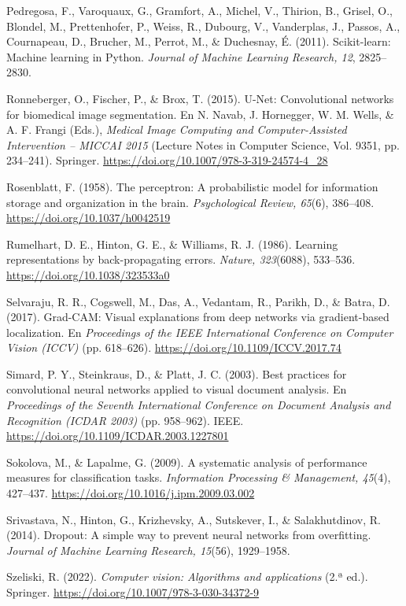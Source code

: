 \documentclass[11pt,letterpaper]{article}
\begin{document}
Pedregosa, F., Varoquaux, G., Gramfort, A., Michel, V., Thirion, B., Grisel, O., Blondel, M., Prettenhofer, P., Weiss, R., Dubourg, V., Vanderplas, J., Passos, A., Cournapeau, D., Brucher, M., Perrot, M., \& Duchesnay, É. (2011). Scikit-learn: Machine learning in Python. \emph{Journal of Machine Learning Research, 12}, 2825--2830.

Ronneberger, O., Fischer, P., \& Brox, T. (2015). U-Net: Convolutional networks for biomedical image segmentation. En N. Navab, J. Hornegger, W. M. Wells, \& A. F. Frangi (Eds.), \emph{Medical Image Computing and Computer-Assisted Intervention -- MICCAI 2015} (Lecture Notes in Computer Science, Vol. 9351, pp. 234--241). Springer. \url{https://doi.org/10.1007/978-3-319-24574-4_28}

Rosenblatt, F. (1958). The perceptron: A probabilistic model for information storage and organization in the brain. \emph{Psychological Review, 65}(6), 386--408. \url{https://doi.org/10.1037/h0042519}

Rumelhart, D. E., Hinton, G. E., \& Williams, R. J. (1986). Learning representations by back-propagating errors. \emph{Nature, 323}(6088), 533--536. \url{https://doi.org/10.1038/323533a0}

Selvaraju, R. R., Cogswell, M., Das, A., Vedantam, R., Parikh, D., \& Batra, D. (2017). Grad-CAM: Visual explanations from deep networks via gradient-based localization. En \emph{Proceedings of the IEEE International Conference on Computer Vision (ICCV)} (pp. 618--626). \url{https://doi.org/10.1109/ICCV.2017.74}

Simard, P. Y., Steinkraus, D., \& Platt, J. C. (2003). Best practices for convolutional neural networks applied to visual document analysis. En \emph{Proceedings of the Seventh International Conference on Document Analysis and Recognition (ICDAR 2003)} (pp. 958--962). IEEE. \url{https://doi.org/10.1109/ICDAR.2003.1227801}

Sokolova, M., \& Lapalme, G. (2009). A systematic analysis of performance measures for classification tasks. \emph{Information Processing \& Management, 45}(4), 427--437. \url{https://doi.org/10.1016/j.ipm.2009.03.002}

Srivastava, N., Hinton, G., Krizhevsky, A., Sutskever, I., \& Salakhutdinov, R. (2014). Dropout: A simple way to prevent neural networks from overfitting. \emph{Journal of Machine Learning Research, 15}(56), 1929--1958.

Szeliski, R. (2022). \emph{Computer vision: Algorithms and applications} (2.ª ed.). Springer. \url{https://doi.org/10.1007/978-3-030-34372-9}
\end{document}
